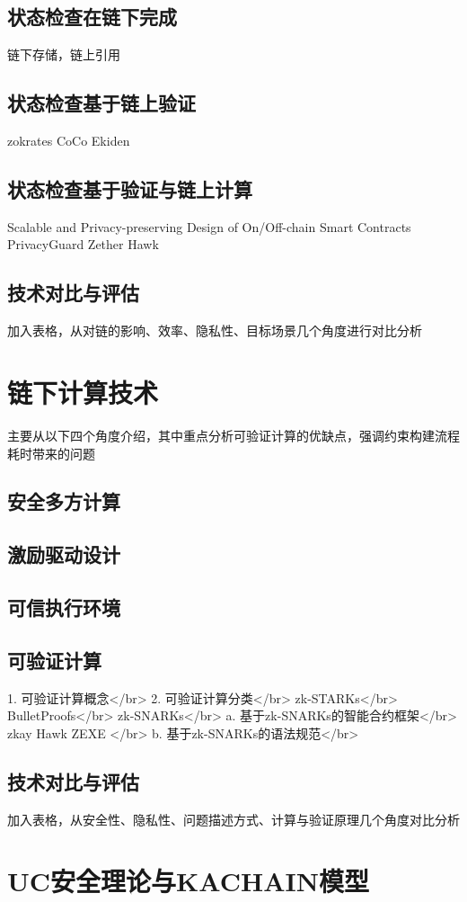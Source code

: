 \subsection{状态检查在链下完成}
链下存储，链上引用

\subsection{状态检查基于链上验证}

zokrates
CoCo
Ekiden

\subsection{状态检查基于验证与链上计算}

Scalable and Privacy-preserving Design of
On/Off-chain Smart Contracts
PrivacyGuard
Zether
Hawk

\subsection{技术对比与评估}

加入表格，从对链的影响、效率、隐私性、目标场景几个角度进行对比分析

\section{链下计算技术}
主要从以下四个角度介绍，其中重点分析可验证计算的优缺点，强调约束构建流程耗时带来的问题

\subsection{安全多方计算}

\subsection{激励驱动设计}

\subsection{可信执行环境}

\subsection{可验证计算}

1. 可验证计算概念</br>
2. 可验证计算分类</br>
zk-STARKs</br>
BulletProofs</br>
zk-SNARKs</br>
a. 基于zk-SNARKs的智能合约框架</br>
zkay Hawk ZEXE </br>
b. 基于zk-SNARKs的语法规范</br>

\subsection{技术对比与评估}

加入表格，从安全性、隐私性、问题描述方式、计算与验证原理几个角度对比分析

\section{UC安全理论与KACHAIN模型}